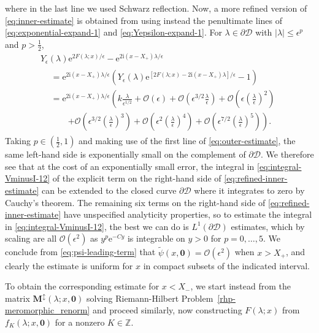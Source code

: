\documentclass[12pt]{amsart}
\numberwithin{equation}{section}
\newcommand{\ee}{\mathrm{e}}
\newcommand{\ii}{\mathrm{i}}
\newcommand{\SP}{\lambda}
\newcommand{\eps}{\epsilon}
\newcommand{\bigo}[1]{ \mathcal{O}\! \left( #1 \right) }
\begin{document}
where in the last line we used Schwarz reflection.
Now, a more refined version of \eqref{eq:inner-estimate} is obtained from using instead the penultimate lines of \eqref{eq:exponential-expand-1} and \eqref{eq:Yepsilon-expand-1}.  For $\SP\in\partial \mathscr{D}$ with $|\SP|\le\epsilon^p$ and $p>\frac{1}{2}$, 
\begin{multline}
Y_\epsilon(\SP)\ee^{2F(\SP;x)/\epsilon}-\ee^{2\ii (x-X_+)\SP/\epsilon}\\
\begin{aligned}
&=\ee^{2\ii (x-X_+)\SP/\epsilon}\left(Y_\epsilon(\SP)\ee^{[2F(\SP;x)-2\ii (x-X_+)\SP]/\epsilon}-1\right) \\{}
&= 
\ee^{2\ii (x-X_+)\SP/\epsilon}\left(k\frac{\lambda}{\epsilon^{1/2}}
+ \bigo{\epsilon}+ \bigo{\epsilon^{3/2}\frac{\SP}{\eps}}+\bigo{\eps\left(\frac{\SP}{\eps}\right)^2}\right.\\
&\qquad{}\left.+\bigo{\eps^{3/2}\left(\frac{\lambda}{\epsilon}\right)^3}+\bigo{\eps^2\left(\frac{\lambda}{\epsilon}\right)^4}+\bigo{\eps^{7/2}\left(\frac{\lambda}{\epsilon}\right)^5}\right).
\end{aligned}
\label{eq:refined-inner-estimate}
\end{multline}
Taking $p\in (\frac{1}{2},1)$ and making use of the first line of \eqref{eq:outer-estimate}, the same left-hand side is exponentially small on the complement of $\partial \mathscr{D}$.  We therefore see that at the cost of an exponentially small error, the integral in \eqref{eq:integral-VminusI-12} of the explicit term on the right-hand side of \eqref{eq:refined-inner-estimate}
can be extended to the closed curve $\partial \mathscr{D}$ where it integrates to zero by Cauchy's theorem.  The remaining six terms on the right-hand side of \eqref{eq:refined-inner-estimate} have unspecified analyticity properties, so to estimate the integral in \eqref{eq:integral-VminusI-12}, the best we can do is $L^1(\partial \mathscr{D})$ estimates, which by scaling are 
all $\bigo{\epsilon^2}$ as $y^p\ee^{-Cy}$ is integrable on $y>0$ for $p=0,\dots,5$.  We conclude from \eqref{eq:psi-leading-term} that $\widetilde{\psi}(x,\mathbf{0})=\bigo{\epsilon^2}$ when $x>X_+$, and clearly the estimate is uniform for $x$ in compact subsets of the indicated interval.

To obtain the corresponding estimate for $x<X_-$, we start instead from the matrix $\mathbf{M}^\updownarrow(\SP;x,\mathbf{0})$ solving Riemann-Hilbert Problem~\ref{rhp-meromorphic_renorm} and proceed similarly, now constructing $F(\SP;x)$ from $f_K(\SP;x,\mathbf{0})$ for a nonzero $K\in\mathbb{Z}$.
\end{document}
